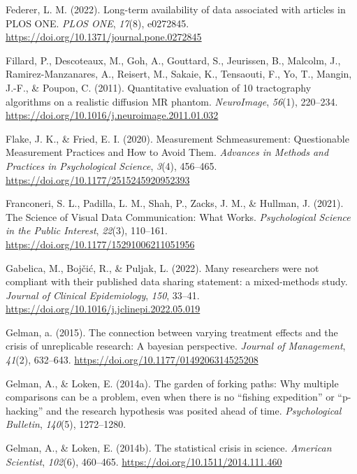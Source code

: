 \documentclass[
  letterpaper,
  DIV=11,
  numbers=noendperiod]{scrreprt}
\newlength{\cslhangindent}
\newlength{\cslentryspacingunit} %
\newenvironment{CSLReferences}[2] %
 {%
  \setlength{\parindent}{0pt}
  \ifodd #1
  \let\oldpar\par
  \def\par{\hangindent=\cslhangindent\oldpar}
  \fi
  \setlength{\parskip}{#2\cslentryspacingunit}
 }%
 {}
\begin{document}
\begin{CSLReferences}{1}{0}
\leavevmode{}%
Federer, L. M. (2022). Long-term availability of data associated with
articles in PLOS ONE. \emph{PLOS ONE}, \emph{17}(8), e0272845.
\url{https://doi.org/10.1371/journal.pone.0272845}

\leavevmode{}%
Fillard, P., Descoteaux, M., Goh, A., Gouttard, S., Jeurissen, B.,
Malcolm, J., Ramirez-Manzanares, A., Reisert, M., Sakaie, K., Tensaouti,
F., Yo, T., Mangin, J.-F., \& Poupon, C. (2011). Quantitative evaluation
of 10 tractography algorithms on a realistic diffusion MR phantom.
\emph{NeuroImage}, \emph{56}(1), 220--234.
\url{https://doi.org/10.1016/j.neuroimage.2011.01.032}

\leavevmode{}%
Flake, J. K., \& Fried, E. I. (2020). Measurement Schmeasurement:
Questionable Measurement Practices and How to Avoid Them. \emph{Advances
in Methods and Practices in Psychological Science}, \emph{3}(4),
456--465. \url{https://doi.org/10.1177/2515245920952393}

\leavevmode{}%
Franconeri, S. L., Padilla, L. M., Shah, P., Zacks, J. M., \& Hullman,
J. (2021). The Science of Visual Data Communication: What Works.
\emph{Psychological Science in the Public Interest}, \emph{22}(3),
110--161. \url{https://doi.org/10.1177/15291006211051956}

\leavevmode{}%
Gabelica, M., Bojčić, R., \& Puljak, L. (2022). Many researchers were
not compliant with their published data sharing statement: a
mixed-methods study. \emph{Journal of Clinical Epidemiology},
\emph{150}, 33--41. \url{https://doi.org/10.1016/j.jclinepi.2022.05.019}

\leavevmode{}%
Gelman, a. (2015). The connection between varying treatment effects and
the crisis of unreplicable research: A bayesian perspective.
\emph{Journal of Management}, \emph{41}(2), 632--643.
\url{https://doi.org/10.1177/0149206314525208}

\leavevmode{}%
Gelman, A., \& Loken, E. (2014a). The garden of forking paths: Why
multiple comparisons can be a problem, even when there is no {``}fishing
expedition{''} or {``}p-hacking{''} and the research hypothesis was
posited ahead of time. \emph{Psychological Bulletin}, \emph{140}(5),
1272--1280.

\leavevmode{}%
Gelman, A., \& Loken, E. (2014b). The statistical crisis in science.
\emph{American Scientist}, \emph{102}(6), 460--465.
\url{https://doi.org/10.1511/2014.111.460}


\end{CSLReferences}
\end{document}
